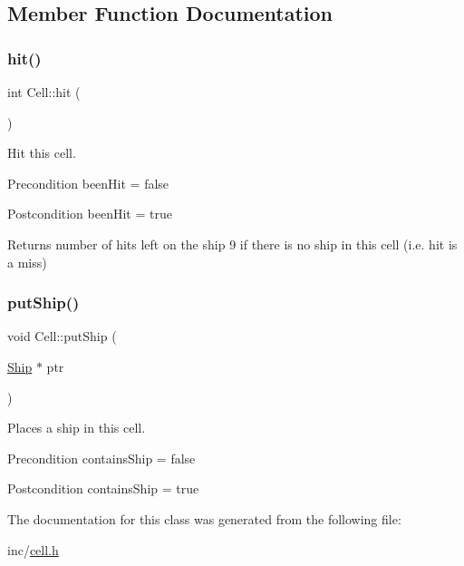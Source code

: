 \subsection{Member Function Documentation}
\mbox{\label{classCell_a0c8236d4cbfbc4172d2bd2fe00f7540d}} 
\subsubsection{\texorpdfstring{hit()}{hit()}}
{\footnotesize\ttfamily int Cell\+::hit (\begin{DoxyParamCaption}{ }\end{DoxyParamCaption})}



Hit this cell. 

\begin{DoxyPrecond}{Precondition}
been\+Hit = false 
\end{DoxyPrecond}
\begin{DoxyPostcond}{Postcondition}
been\+Hit = true 
\end{DoxyPostcond}
\begin{DoxyReturn}{Returns}
number of hits left on the ship 9 if there is no ship in this cell (i.\+e. hit is a miss) 
\end{DoxyReturn}
\mbox{\label{classCell_a853a0bd48cfa519ae240a474059bc0c1}} 
\subsubsection{\texorpdfstring{putShip()}{putShip()}}
{\footnotesize\ttfamily void Cell\+::put\+Ship (\begin{DoxyParamCaption}\item[{\mbox{\hyperlink{classShip}{Ship}} $\ast$}]{ptr }\end{DoxyParamCaption})}



Places a ship in this cell. 

\begin{DoxyPrecond}{Precondition}
contains\+Ship = false 
\end{DoxyPrecond}
\begin{DoxyPostcond}{Postcondition}
contains\+Ship = true 
\end{DoxyPostcond}


The documentation for this class was generated from the following file\+:\begin{DoxyCompactItemize}
\item 
inc/\mbox{\hyperlink{cell_8h}{cell.\+h}}\end{DoxyCompactItemize}
